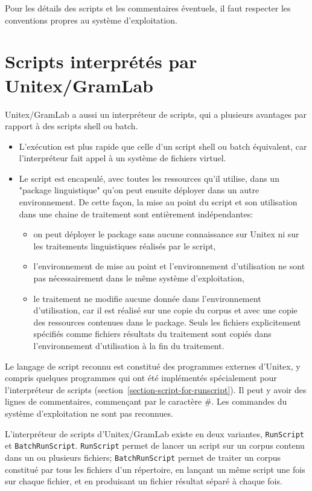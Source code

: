 \noindent Pour les détails des scripts et les commentaires éventuels, il faut respecter les conventions
propres au système d'exploitation.

\section{Scripts interprétés par Unitex/GramLab}
\label{section-unitex-scripts}

Unitex/GramLab a aussi un interpréteur de scripts, qui a plusieurs avantages par rapport à des scripts
shell ou batch.
\begin{itemize}
    \item L'exécution est plus rapide que celle d'un script shell ou batch équivalent, car l'interpréteur fait
appel à un système de fichiers virtuel.
    \item Le script est encapsulé, avec toutes les ressources qu'il utilise, dans un "package linguistique"
qu'on peut ensuite déployer dans un autre environnement. De cette façon, la mise au point du script
et son utilisation dans une chaine de traitement sont entièrement indépendantes:
\begin{itemize}
    \item on peut déployer le package sans aucune connaissance sur Unitex ni sur les traitements
linguistiques réalisés par le script,
    \item l'environnement de mise au point et l'environnement d'utilisation ne sont pas nécessairement
dans le même système d'exploitation,
    \item le traitement ne modifie aucune donnée dans l'environnement d'utilisation, car il est réalisé
sur une copie du corpus et avec une copie des ressources contenues dans le package. Seuls les fichiers
explicitement spécifiés comme fichiers résultats du traitement sont copiés dans l'environnement
d'utilisation à la fin du traitement.
\end{itemize}
\end{itemize}

\noindent Le langage de script reconnu est constitué des programmes externes d'Unitex, y compris quelques programmes qui ont été implémentés spécialement pour l'interpréteur de scripts
(section~\ref{section-script-for-runscript}). Il peut y avoir des lignes de commentaires, commençant
par le caractère \#. Les commandes du système d'exploitation ne sont pas reconnues.

\bigskip
\noindent L'interpréteur de scripts d'Unitex/GramLab existe en deux variantes, \verb$RunScript$ et
\verb$BatchRunScript$. \verb$RunScript$ permet de lancer un script sur un corpus contenu dans un
ou plusieurs fichiers; \verb$BatchRunScript$ permet de traiter un corpus constitué par tous les fichiers
d'un répertoire, en lançant un même script une fois sur chaque fichier, et en produisant un fichier résultat
séparé à chaque fois.


